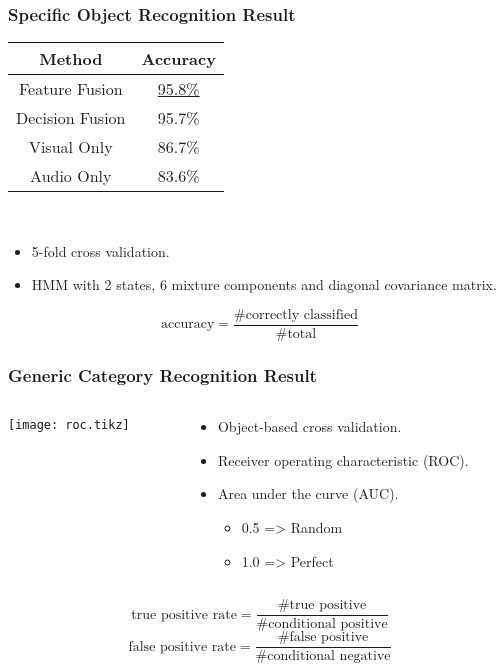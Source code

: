 \documentclass{beamer}
\begin{document}
  \begin{frame}
    \frametitle{Specific Object Recognition Result}

    \centering
    \begin{tabular}[h]{c|c}
      \hline
      Method & Accuracy \\ \hline \hline
      Feature Fusion & \underline{95.8\%} \\ \hline
      Decision Fusion  & 95.7\% \\ \hline
      Visual Only & 86.7\% \\ \hline
      Audio Only & 83.6\% \\ \hline
    \end{tabular}

    ~
    \begin{itemize}
      \item 5-fold cross validation.
      \item HMM with 2 states, 6 mixture components and diagonal covariance matrix.
    \end{itemize}
    \vfill
    {\scriptsize
      \[ \text{accuracy} =  \frac{\text{\# correctly classified}}{\text{\# total}} \]
    }
  \end{frame}

  \begin{frame}
    \frametitle{Generic Category Recognition Result}

    \begin{columns}
      \begin{column}{.5\textwidth}
        \centering
        \scriptsize
        \texttt{[image: roc.tikz]}
      \end{column}
      \begin{column}{.5\textwidth}
        \begin{itemize}
          \item Object-based cross validation.
          \item Receiver operating characteristic (ROC).
          \item Area under the curve (AUC).
            \begin{itemize}
              \item 0.5 => Random
              \item 1.0 => Perfect 
            \end{itemize}
        \end{itemize}
      \end{column}
    \end{columns}
    {\scriptsize
      \[ \text{true positive rate} =  \frac{\text{\# true positive}}{\text{\# conditional positive}} \]
      \[ \text{false positive rate} =  \frac{\text{\# false positive}}{\text{\# conditional negative}} \]
    }
  \end{frame}
\end{document}
